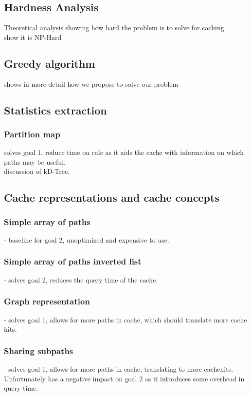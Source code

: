 
\subsection{Hardness Analysis}
Theoretical analysis showing how hard the problem is to solve for \spath caching.\\
show it is NP-Hard
 

\subsection{Greedy algorithm}
shows in more detail how we propose to solve our problem


\subsection{Statistics extraction}

\subsubsection{Partition map} 
solves goal 1. reduce time on \spath calc as it aids the cache with information on which paths may be useful.\\ 
discussion of kD-Tree.


\subsection{Cache representations and cache concepts} 

\subsubsection{Simple array of paths} - baseline for goal 2, unoptimized and expensive to use.

\subsubsection{Simple array of paths inverted list} - solves goal 2, reduces the query time of the cache.

\subsubsection{Graph representation} - solves goal 1, allows for more paths in cache, which should translate more cache hits.

\subsubsection{Sharing subpaths} - solves goal 1, allows for more paths in cache, translating to more cachehits. Unfortunately has a negative impact on goal 2 as it introduces some overhead in query time.

